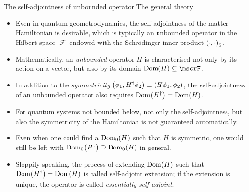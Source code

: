 \documentclass[8pt]{beamer}
\begin{document}
\begin{frame}%
{The self-adjointness of unbounded operator}%
{The general theory}
\begin{itemize}
\item Even in quantum geometrodynamics, the self-adjointness of the matter
Hamiltonian is desirable,
which is typically an unbounded operator in the Hilbert space $\mscrF$ endowed
with the Schr\"odinger inner product ${\left(\cdot,\cdot\right)}_\text{S}$.

\item Mathematically, an \emph{unbounded} operator
$H$ is characterised not only by its action on a vector, but also by its domain
$\rfun{\mathrm{Dom}}{H} \subsetneq \mscrF$.

\item In addition to the \emph{symmetricity} ${\left(\phi_1, H^\dagger \phi_2\right)}
\equiv {\left(H \phi_1, \phi_2\right)}$, the self-adjointness of an unbounded operator
also requires ${\mathrm{Dom}}\mathopen{}\left(H^\dagger\right)\mathclose{} = {\mathrm{Dom}}\mathopen{}\left(H\right)\mathclose{}$.

\item For quantum systems not bounded below, not only the self-adjointness, but
also the symmetricity of the Hamiltonian is not guaranteed automatically.

\item Even when one could find a ${\mathrm{Dom}_0}\mathopen{}\left(H\right)\mathclose{}$ such that $H$ is
symmetric, one would still be left with ${\mathrm{Dom}_0}\mathopen{}\left(H^\dagger\right)\mathclose{}
\supseteq {\mathrm{Dom}_0}\mathopen{}\left(H\right)\mathclose{}$ in general.

\item Sloppily speaking, the process of extending ${\mathrm{Dom}}\mathopen{}\left(H\right)\mathclose{}$ such
that ${\mathrm{Dom}}\mathopen{}\left(H^\dagger\right)\mathclose{} = {\mathrm{Dom}}\mathopen{}\left(H\right)\mathclose{}$ is called
\alert{self-adjoint extension}; if the extension is unique, the operator is called
\emph{essentially self-adjoint}.

\end{itemize}
\end{frame}
\end{document}
